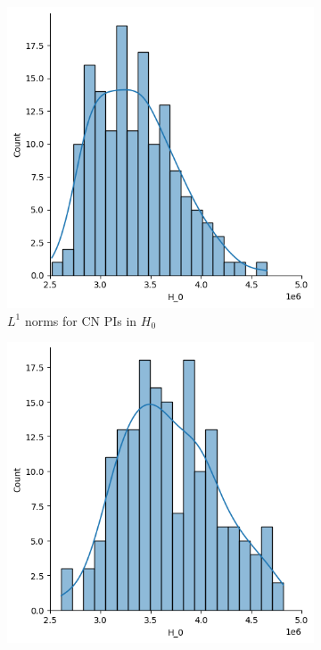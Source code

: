 \documentclass{article}
\begin{document}
\begin{figure}[htb]
  \centering
  \begin{subfigure}{0.32\textwidth}
    \includegraphics[width=\textwidth]{figures/median_pis/median_pi_CN_H_0_displot.png}
    \caption{$L^1$ norms for CN PIs in $H_0$}
  \end{subfigure}
  \begin{subfigure}{0.32\textwidth}
    \includegraphics[width=\textwidth]{figures/median_pis/median_pi_MCI_H_0_displot.png}

\end{subfigure}
\end{figure}
\end{document}
